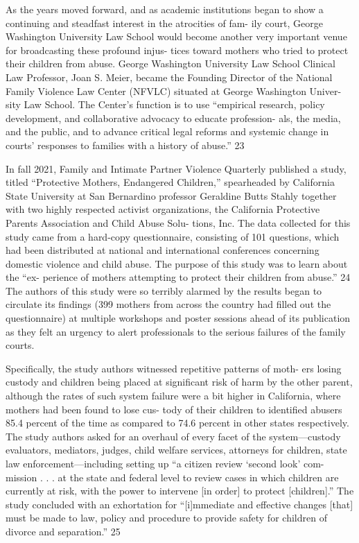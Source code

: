 As the years moved forward, and as academic institutions began
to show a continuing and steadfast interest in the atrocities of fam-
ily court, George Washington University Law School would become
another very important venue for broadcasting these profound injus-
tices toward mothers who tried to protect their children from abuse.
George Washington University Law School Clinical Law Professor,
Joan S. Meier, became the Founding Director of the National Family
Violence Law Center (NFVLC) situated at George Washington Univer-
sity Law School. The Center’s function is to use “empirical research,
policy development, and collaborative advocacy to educate profession-
als, the media, and the public, and to advance critical legal reforms
and systemic change in courts’ responses to families with a history of
abuse.” 23 \pfl{}


In fall 2021, Family and Intimate Partner Violence Quarterly published
a study, titled “Protective Mothers, Endangered Children,” spearheaded
by California State University at San Bernardino professor Geraldine
Butts Stahly together with two highly respected activist organizations,
the California Protective Parents Association and Child Abuse Solu-
tions, Inc. The data collected for this study came from a hard-copy
questionnaire, consisting of 101 questions, which had been distributed
at national and international conferences concerning domestic violence
and child abuse. The purpose of this study was to learn about the “ex-
perience of mothers attempting to protect their children from abuse.” 24
The authors of this study were so terribly alarmed by the results began
to circulate its findings (399 mothers from across the country had filled
out the questionnaire) at multiple workshops and poster sessions ahead
of its publication as they felt an urgency to alert professionals to the
serious failures of the family courts. \pfl{}


Specifically, the study authors witnessed repetitive patterns of moth-
ers losing custody and children being placed at significant risk of harm
by the other parent, although the rates of such system failure were a
bit higher in California, where mothers had been found to lose cus-
tody of their children to identified abusers 85.4 percent of the time as
compared to 74.6 percent in other states respectively. The study authors
asked for an overhaul of every facet of the system—custody evaluators,
mediators, judges, child welfare services, attorneys for children, state law
enforcement—including setting up “a citizen review ‘second look’ com-
mission . . . at the state and federal level to review cases in which children
are currently at risk, with the power to intervene [in order] to protect
[children].” The study concluded with an exhortation for “[i]mmediate
and effective changes [that] must be made to law, policy and procedure
to provide safety for children of divorce and separation.” 25 \pfl{}


